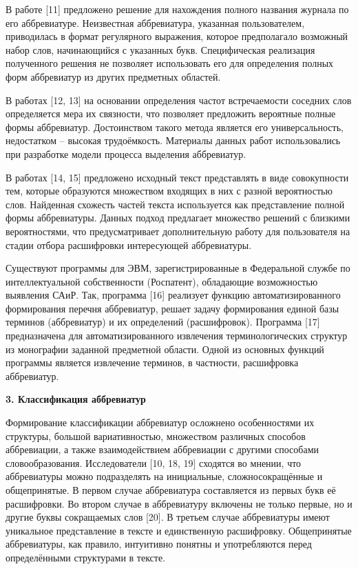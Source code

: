 \documentclass{article}
\begin{document}
В работе [11] предложено решение для нахождения полного
названия журнала по его аббревиатуре. Неизвестная аббревиатура,
указанная пользователем, приводилась в формат регулярного
выражения, которое предполагало возможный набор слов,
начинающийся с указанных букв. Специфическая реализация
полученного решения не позволяет использовать его для определения
полных форм аббревиатур из других предметных областей.

В работах [12, 13] на основании определения частот
встречаемости соседних слов определяется мера их связности, что
позволяет предложить вероятные полные формы аббревиатур.
Достоинством такого метода является его универсальность,
недостатком – высокая трудоёмкость. Материалы данных работ
использовались при разработке модели процесса выделения
аббревиатур.

В работах [14, 15] предложено исходный текст представлять в
виде совокупности тем, которые образуются множеством входящих в
них с разной вероятностью слов. Найденная схожесть частей текста
используется как представление полной формы аббревиатуры.
Данных подход предлагает множество решений с близкими
вероятностями, что предусматривает дополнительную работу для
пользователя на стадии отбора расшифровки интересующей
аббревиатуры.

Существуют программы для ЭВМ, зарегистрированные в
Федеральной службе по интеллектуальной собственности
(Роспатент), обладающие возможностью выявления САиР. Так,
программа [16] реализует функцию автоматизированного
формирования перечня аббревиатур, решает задачу формирования
единой базы терминов (аббревиатур) и их определений
(расшифровок). Программа [17] предназначена для
автоматизированного извлечения терминологических структур из
монографии заданной предметной области. Одной из основных
функций программы является извлечение терминов, в частности,
расшифровка аббревиатур.

\textbf{3. Классификация аббревиатур}

Формирование классификации аббревиатур осложнено
особенностями их структуры, большой вариативностью, множеством
различных способов аббревиации, а также взаимодействием
аббревиации с другими способами словообразования. Исследователи
[10, 18, 19] сходятся во мнении, что аббревиатуры можно
подразделять на инициальные, сложносокращённые и общепринятые.
В первом случае аббревиатура составляется из первых букв её
расшифровки. Во втором случае в аббревиатуру включены не только
первые, но и другие буквы сокращаемых слов [20]. В третьем случае
аббревиатуры имеют уникальное представление в тексте и
единственную расшифровку. Общепринятые аббревиатуры, как
правило, интуитивно понятны и употребляются перед
определёнными структурами в тексте.
\end{document}
